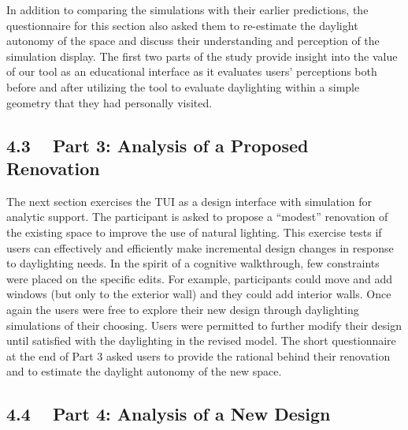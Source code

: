 \documentclass{article}
\begin{document}
In addition to comparing the simulations with their earlier
predictions, the questionnaire for this section also asked them to
re-estimate the daylight autonomy of the space and discuss their
understanding and perception of the simulation display.  The first two
parts of the study provide insight into the value of our tool as an
educational interface as it evaluates users' perceptions both before
and after utilizing the tool to evaluate daylighting within a simple
geometry that they had personally visited.























\subsection{4.3 ~ Part 3: Analysis of a Proposed Renovation}

The next section exercises the TUI as a design interface with
simulation for analytic support.  The participant is asked to propose
a ``modest'' renovation of the existing space to improve the use of
natural lighting.  This exercise tests if users can effectively and
efficiently make incremental design changes in response to daylighting
needs.  In the spirit of a cognitive walkthrough, few constraints were
placed on the specific edits.  For example, participants could move
and add windows (but only to the exterior wall) and they could add
interior walls.  Once again the users were free to explore their new
design through daylighting simulations of their choosing.  Users were
permitted to further modify their design until satisfied with the
daylighting in the revised model.
%
The short questionnaire at the end of Part 3 asked users to provide
the rational behind their renovation and to estimate the daylight
autonomy of the new space.  


\subsection{4.4 ~ Part 4: Analysis of a New Design}
\end{document}
